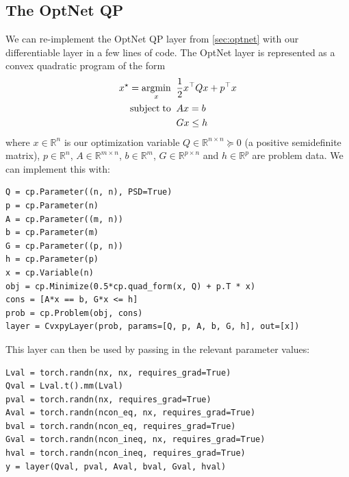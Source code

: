 \subsection{The OptNet QP}
We can re-implement the OptNet QP layer from \cref{sec:optnet}
with our differentiable \cvxpy{} layer in a few lines of code.
The OptNet layer is represented as a convex quadratic program
of the form
\begin{equation}
\begin{split}
x^\star = \operatorname*{argmin}_{x} \;\; & \frac{1} {2}x^\top Qx + p^\top x \\
\operatorname*{subject\;to} \;\; & Ax = b \\
& Gx \leq h \\
\end{split}
\label{eq:cvxpy-qp}
\end{equation}
where $x \in \mathbb{R}^n$ is our optimization variable
$Q \in \mathbb {R}^{n \times n} \succeq 0$
(a positive semidefinite matrix),
$p \in \mathbb {R}^n$,
$A\in \mathbb{R}^{m \times n}$,
$b \in \mathbb{R}^m$,
$G \in \mathbb{R}^ {p \times n}$ and
$h \in \mathbb{R}^{p}$ are problem data.
We can implement this with:

\begin{lstlisting}
Q = cp.Parameter((n, n), PSD=True)
p = cp.Parameter(n)
A = cp.Parameter((m, n))
b = cp.Parameter(m)
G = cp.Parameter((p, n))
h = cp.Parameter(p)
x = cp.Variable(n)
obj = cp.Minimize(0.5*cp.quad_form(x, Q) + p.T * x)
cons = [A*x == b, G*x <= h]
prob = cp.Problem(obj, cons)
layer = CvxpyLayer(prob, params=[Q, p, A, b, G, h], out=[x])
\end{lstlisting}

This layer can then be used by passing in the
relevant parameter values:
\begin{lstlisting}
Lval = torch.randn(nx, nx, requires_grad=True)
Qval = Lval.t().mm(Lval)
pval = torch.randn(nx, requires_grad=True)
Aval = torch.randn(ncon_eq, nx, requires_grad=True)
bval = torch.randn(ncon_eq, requires_grad=True)
Gval = torch.randn(ncon_ineq, nx, requires_grad=True)
hval = torch.randn(ncon_ineq, requires_grad=True)
y = layer(Qval, pval, Aval, bval, Gval, hval)
\end{lstlisting}

\newpage
